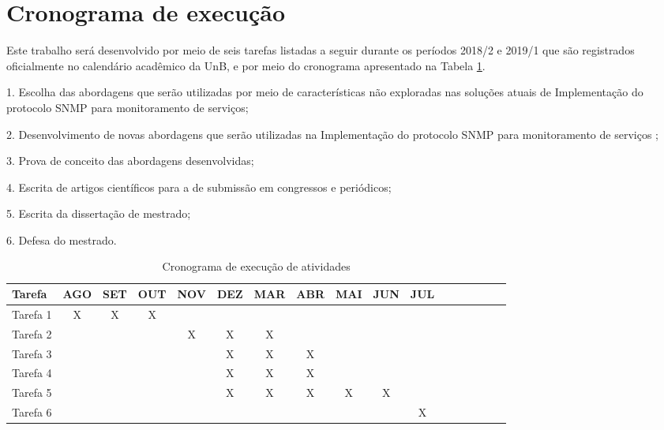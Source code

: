 \section{Cronograma de execução}

Este trabalho será desenvolvido por meio de seis tarefas listadas a seguir durante os períodos 2018/2 e 2019/1 que são registrados oficialmente no calendário acadêmico da UnB, e por meio do cronograma apresentado na Tabela \ref{tab:cronograma}.

	1. Escolha das abordagens que serão utilizadas por meio de características não exploradas nas soluções atuais de Implementação do protocolo SNMP para monitoramento de serviços;
  
  2. Desenvolvimento de novas abordagens que serão utilizadas na Implementação do protocolo SNMP para monitoramento de serviços ;
    
  3. Prova de conceito das abordagens desenvolvidas;
    
  4. Escrita de artigos científicos para a de submissão em congressos e periódicos;
  
  5. Escrita da dissertação de mestrado;
  
  6. Defesa do mestrado.

\begin{table}[!htpb]
	\centering
	\caption{Cronograma de execução de atividades}
	\begin{center}
		\begin{tabular}{|l|c|c|c|c|c|c|c|c|c|c|c|c|c|c|c|c|} \hline
Tarefa&AGO&SET&OUT&NOV&DEZ&MAR&ABR&MAI&JUN&JUL\\
			\hline
			Tarefa 1 &X&X&X& & & & & & & \\
			\hline
			Tarefa 2 & & & &X&X&X& & & & \\
			\hline
			Tarefa 3 & & & & &X&X&X& & & \\
			\hline
			Tarefa 4 & & & & &X&X&X& & & \\
			\hline
			Tarefa 5 & & & &&X&X&X&X&X& \\
			\hline
			Tarefa 6 & & & & & & & & & &X \\
			\hline
		\end{tabular}
		\label{tab:cronograma}
	\end{center}
\end{table} 


\selectfont%